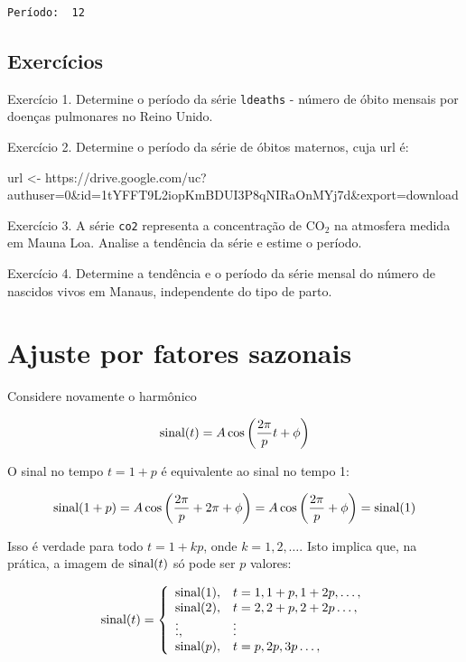 \documentclass[
  letterpaper,
  DIV=11,
  numbers=noendperiod]{scrreprt}
\newenvironment{Shaded}{\begin{snugshade}}{\end{snugshade}}
\newcommand{\NormalTok}[1]{\textcolor[rgb]{0.00,0.23,0.31}{#1}}
\newcommand{\OtherTok}[1]{\textcolor[rgb]{0.00,0.23,0.31}{#1}}
\newcommand{\StringTok}[1]{\textcolor[rgb]{0.13,0.47,0.30}{#1}}
\begin{document}
\begin{verbatim}
Período:  12 
\end{verbatim}

\hypertarget{exercuxedcios-2}{%
\subsection{Exercícios}\label{exercuxedcios-2}}

Exercício 1. Determine o período da série \texttt{ldeaths} - número de
óbito mensais por doenças pulmonares no Reino Unido.

Exercício 2. Determine o período da série de óbitos maternos, cuja url
é:

\begin{Shaded}
\begin{Highlighting}[]
\NormalTok{url }\OtherTok{\textless{}{-}} \StringTok{\textquotesingle{}https://drive.google.com/uc?authuser=0\&id=1tYFFT9L2iopKmBDUI3P8qNIRaOnMYj7d\&export=download\textquotesingle{}}
\end{Highlighting}
\end{Shaded}

Exercício 3. A série \texttt{co2} representa a concentração de CO\(_2\)
na atmosfera medida em Mauna Loa. Analise a tendência da série e estime
o período.

Exercício 4. Determine a tendência e o período da série mensal do número
de nascidos vivos em Manaus, independente do tipo de parto.

\hypertarget{ajuste-por-fatores-sazonais}{%
\section{Ajuste por fatores
sazonais}\label{ajuste-por-fatores-sazonais}}

Considere novamente o harmônico

\[\hbox{sinal}(t)=A\cos\left(\frac{2\pi}{p}t+\phi\right)\]

O sinal no tempo \(t=1+p\) é equivalente ao sinal no tempo 1:

\[\hbox{sinal}(1+p)=A\cos\left(\frac{2\pi}{p}+2\pi+\phi\right)=A\cos\left(\frac{2\pi}{p}+\phi\right)=\hbox{sinal}(1)\]

Isso é verdade para todo \(t=1+kp\), onde \(k=1,2,\ldots.\) Isto implica
que, na prática, a imagem de \(\hbox{sinal}(t)\) só pode ser \(p\)
valores:

\[\hbox{sinal}(t)=\left\{\begin{array}{ll}\hbox{sinal}(1),&t=1,1+p,1+2p,\ldots,\\
\hbox{sinal}(2),&t=2,2+p,2+2p\ldots,\\
\vdots,&\vdots\\
\hbox{sinal}(p),&t=p,2p,3p\ldots,\end{array}\right.\]
\end{document}
